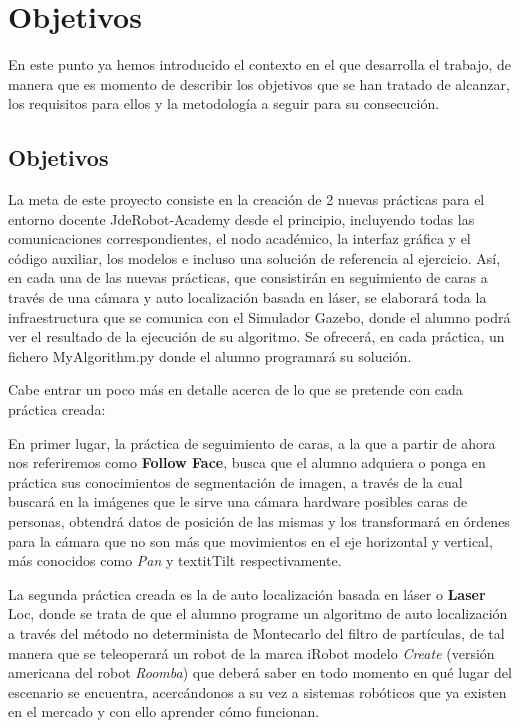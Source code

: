 \chapter{Objetivos}\label{cap.objetivos}
En este punto ya hemos introducido el contexto en el que desarrolla el trabajo, de manera que es momento de describir los objetivos que se han tratado de alcanzar, los requisitos para ellos y la metodología a seguir para su consecución.

\section{Objetivos}
La meta de este proyecto consiste en la creación de 2 nuevas prácticas para el entorno docente JdeRobot-Academy desde el principio, incluyendo todas las comunicaciones correspondientes, el nodo académico, la interfaz gráfica y el código auxiliar, los modelos e incluso una solución de referencia al ejercicio. Así, en cada una de las nuevas prácticas, que consistirán en seguimiento de caras a través de una cámara y auto localización basada en láser, se elaborará toda la infraestructura que se comunica con el Simulador Gazebo, donde el alumno podrá ver el resultado de la ejecución de su algoritmo. Se ofrecerá, en cada práctica, un fichero MyAlgorithm.py donde el alumno programará su solución.

Cabe entrar un poco más en detalle acerca de lo que se pretende con cada práctica creada:
\vspace{0.6cm}

En primer lugar, la práctica de seguimiento de caras, a la que a partir de ahora nos referiremos como \textbf{Follow Face}, busca que el alumno adquiera o ponga en práctica sus conocimientos de segmentación de imagen, a través de la cual buscará en la imágenes que le sirve una cámara hardware posibles caras de personas, obtendrá datos de posición de las mismas y los transformará en órdenes para la cámara que no son más que movimientos en el eje horizontal y vertical, más conocidos como \textit{Pan} y textit{Tilt} respectivamente.

La segunda práctica creada es la de auto localización basada en láser o \textbf{Laser} Loc, donde se trata de que el alumno programe un algoritmo de auto localización a través del método no determinista de Montecarlo del filtro de partículas, de tal manera que se teleoperará un robot de la marca iRobot modelo \textit{Create} (versión americana del robot \textit{Roomba}) que deberá saber en todo momento en qué lugar del escenario se encuentra, acercándonos a su vez a sistemas robóticos que ya existen en el mercado y con ello aprender cómo funcionan.
\vspace{0.6cm}

